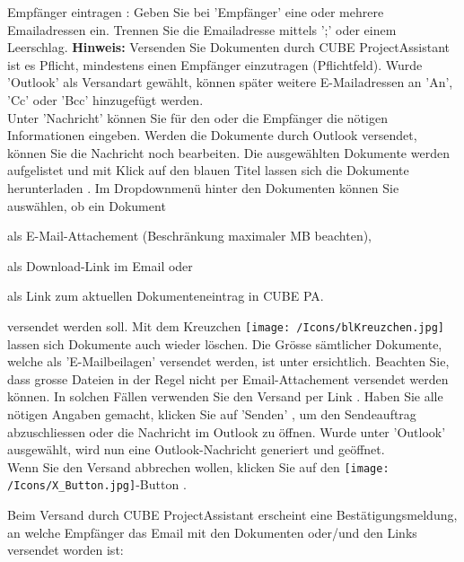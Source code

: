 Empfänger eintragen : Geben Sie bei 'Empfänger' eine oder mehrere Emailadressen ein. Trennen Sie die Emailadresse mittels ';' oder einem Leerschlag. \textbf{Hinweis:} Versenden Sie Dokumenten durch CUBE ProjectAssistant ist es Pflicht, mindestens einen Empfänger einzutragen (Pflichtfeld). Wurde 'Outlook' als Versandart gewählt, können später weitere E-Mailadressen an 'An', 'Cc' oder 'Bcc' hinzugefügt werden.\\
Unter 'Nachricht'  können Sie für den oder die Empfänger die nötigen Informationen eingeben. Werden die Dokumente durch Outlook versendet, können Sie die Nachricht noch bearbeiten. Die ausgewählten Dokumente werden aufgelistet und mit Klick auf den blauen Titel lassen sich die Dokumente herunterladen . Im Dropdownmenü  hinter den Dokumenten können Sie auswählen, ob ein Dokument\\

\begin{compactitem}
	\item als E-Mail-Attachement (Beschränkung maximaler MB beachten),
	\item als Download-Link im Email oder
	\item als Link zum aktuellen Dokumenteneintrag in CUBE PA.
\end{compactitem}

versendet werden soll. Mit dem Kreuzchen \texttt{[image: /Icons/blKreuzchen.jpg]}  lassen sich Dokumente auch wieder löschen. Die Grösse sämtlicher Dokumente, welche als 'E-Mailbeilagen' versendet werden, ist unter  ersichtlich. Beachten Sie, dass grosse Dateien in der Regel nicht per Email-Attachement versendet werden können. In solchen Fällen verwenden Sie den Versand per Link . Haben Sie alle nötigen Angaben gemacht, klicken Sie auf 'Senden' , um den Sendeauftrag abzuschliessen oder die Nachricht im Outlook zu öffnen. Wurde unter  'Outlook' ausgewählt, wird nun eine Outlook-Nachricht generiert und geöffnet.\\
Wenn Sie den Versand abbrechen wollen, klicken Sie auf den \texttt{[image: /Icons/X\_Button.jpg]}-Button .

\vspace{\baselineskip}

Beim Versand durch CUBE ProjectAssistant erscheint eine Bestätigungsmeldung, an welche Empfänger das Email mit den Dokumenten oder/und den Links versendet worden ist:

\begin{figure}[H]
\end{figure}
\vspace{-10pt}

